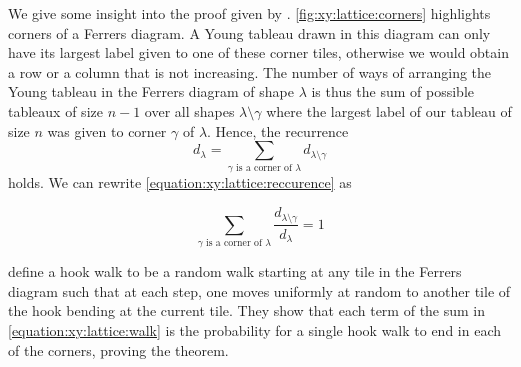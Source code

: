 We give some insight into the proof given by \citet*{greene:1979}.
\ref{fig:xy:lattice:corners} highlights corners of a Ferrers diagram. A Young
tableau drawn in this diagram can only have its largest label given to
one of these corner tiles, otherwise we would obtain a row or a column that is
not increasing. The number of ways of arranging the Young tableau in the
Ferrers diagram of shape \(\lambda\) is thus the sum of possible tableaux of
size \(n-1\) over all shapes \(\lambda \setminus \gamma\) where the largest
label of our tableau of size \(n\) was given to corner \(\gamma\) of
\(\lambda\). Hence, the recurrence
\begin{equation}\label{equation:xy:lattice:reccurence}
d_{\lambda} = \sum_{\gamma \text{ is a corner of } \lambda} d_{\lambda
\setminus \gamma}
\end{equation}
holds. We can rewrite \ref{equation:xy:lattice:reccurence} as

\begin{equation}\label{equation:xy:lattice:walk}
\sum_{\gamma \text{ is a corner of } \lambda} \frac{d_{\lambda
\setminus \gamma}}{d_{\lambda}} = 1
\end{equation}

\citet*{greene:1979} define a hook walk to be a random walk starting at
any tile in the Ferrers diagram such that at each step, one moves uniformly at
random to another tile of the hook bending at the current tile.
They show that each term of the sum in \ref{equation:xy:lattice:walk} is
the probability for a single hook walk to end in each of the corners, proving
the theorem.

